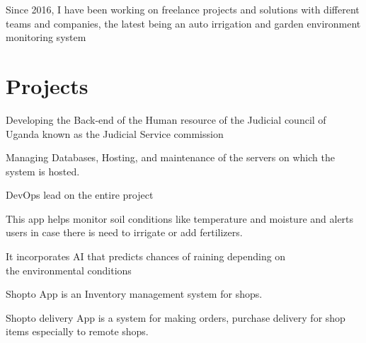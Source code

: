 \documentclass[]{plushcv}
\begin{document}
\begin{tightemize}
\item Since 2016, I have been working on freelance projects and solutions with different teams and companies, the latest being an auto irrigation and garden environment monitoring system
\end{tightemize}
\sectionsep



\section{Projects}\label{sec:projects}


\begin{tightemize}
\item Developing the Back-end of the Human resource of the Judicial council of Uganda known as the Judicial Service commission
\item Managing Databases, Hosting, and maintenance of the servers on which the system is hosted.
\item DevOps lead on the entire project
\end{tightemize}
\sectionsep

\begin{tightemize}
\item This app helps monitor soil conditions like temperature and moisture and alerts users in case there is need to irrigate or add fertilizers.
\item It incorporates AI that predicts chances of raining depending on \\ the environmental conditions
\end{tightemize}
\sectionsep

\begin{tightemize}
\item Shopto App is an Inventory management system for shops. 
\item Shopto delivery App is a system for making orders, purchase delivery for shop items especially to remote shops.
\end{tightemize}
\sectionsep
\end{document}
